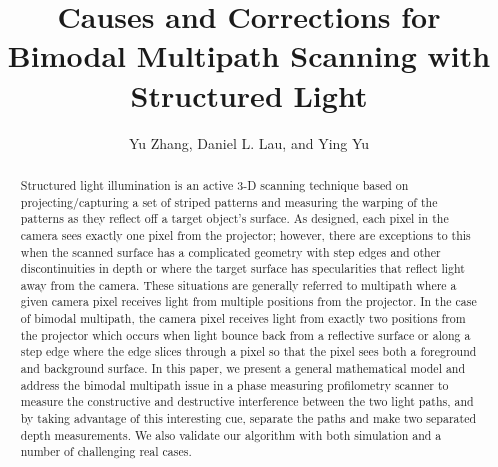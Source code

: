 \documentclass[10pt]{article}
\begin{document}
\title{Causes and Corrections for Bimodal Multipath Scanning with Structured Light}


\author{Yu Zhang, Daniel L. Lau, and Ying Yu}

\address{School of Electronic Science and Engineering, Nanjing University, Nanjing, 210023, China\\
Department of Electrical Engineering, University of Kentucky, Lexington, KY, 40507, USA\\


dllau@uky.edu\\

}





\begin{abstract}
Structured light illumination is an active 3-D scanning technique based on projecting/capturing a set of striped patterns and measuring the warping of the patterns as they reflect off a target object's surface. As designed, each pixel in the camera sees exactly one pixel from the projector; however, there are exceptions to this when the scanned surface has a complicated geometry with step edges and other discontinuities in depth or where the target surface has specularities that reflect light away from the camera. These situations are generally referred to multipath where a given camera pixel receives light from multiple positions from the projector.  In the case of bimodal multipath, the camera pixel receives light from exactly two positions from the projector which occurs when light bounce back from a reflective surface or along a step edge where the edge slices through a pixel so that the pixel sees both a foreground and background surface.  In this paper, we present a general mathematical model and address the bimodal multipath issue in a phase measuring profilometry scanner to measure the constructive and destructive interference between the two light paths, and by taking advantage of this interesting cue, separate the paths and make two separated depth measurements. We also validate our algorithm with both simulation and a number of challenging real cases.    
\end{abstract}
\end{document}
